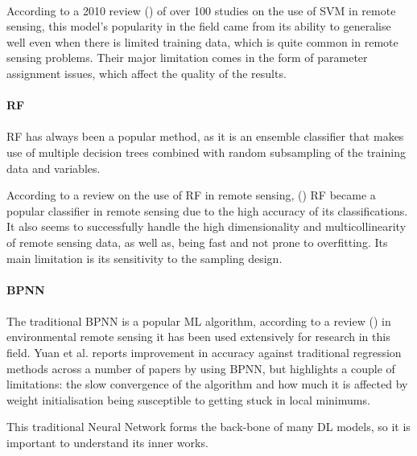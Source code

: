 \paragraph{}
According to a 2010 review (\cite{MOUNTRAKIS2011247}) of over 100 studies on the use of \gls{SVM} in remote sensing, this model's popularity in the field came from its ability to generalise well even when there is limited training data, which is quite common in remote sensing problems. Their major limitation comes in the form of parameter assignment issues, which affect the quality of the results.

\paragraph{\gls{RF}}
\paragraph{}
\gls{RF} has always been a popular method, as it is an ensemble classifier that makes use of multiple decision trees combined with random subsampling of the training data and variables. 

According to a review on the use of \gls{RF} in remote sensing, (\cite{BELGIU201624}) \gls{RF} became a popular classifier in remote sensing due to the high accuracy of its classifications. It also seems to successfully handle the high dimensionality and multicollinearity of remote sensing data, as well as, being fast and not prone to overfitting. Its main limitation is its sensitivity to the sampling design.

\paragraph{\gls{BPNN}}
\paragraph{}
The traditional \gls{BPNN} is a popular \gls{ML} algorithm, according to a review (\cite{YUAN2020111716}) in environmental remote sensing it has been used extensively for research in this field. Yuan et al. reports improvement in accuracy against traditional regression methods across a number of papers by using \gls{BPNN}, but highlights a couple of limitations: the slow convergence of the algorithm and how much it is affected by weight initialisation being susceptible to getting stuck in local minimums. 

This traditional Neural Network forms the back-bone of many \gls{DL} models, so it is important to understand its inner works.


